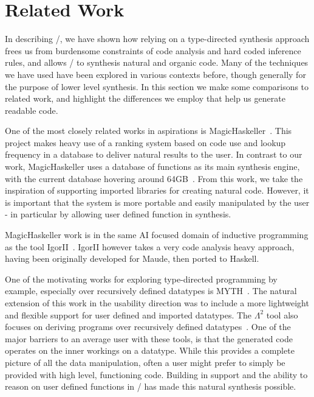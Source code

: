 \section{Related Work}
\label{sec:related}

In describing \ourTool/, we have shown how relying on a type-directed synthesis approach frees us from burdensome constraints of code analysis and hard coded inference rules, and allows \ourTool/ to synthesis natural and organic code. Many of the techniques we have used have been explored in various contexts before, though generally for the purpose of lower level synthesis. In this section we make some comparisons to related work, and highlight the differences we employ that help us generate readable code.

One of the most closely related works in aspirations is MagicHaskeller~\cite{DBLP:conf/aaip/Katayama09}. This project makes heavy use of a ranking system based on code use and lookup frequency in a database to deliver natural results to the user. In contrast to our work, MagicHaskeller uses a database of functions as its main synthesis engine, with the current database hovering around 
64GB~\cite{DBLP:conf/agi/Katayama15}. From this work, we take the inspiration of supporting imported libraries for creating natural code. However, it is important that the system is more portable and easily manipulated by the user - in particular by allowing user defined function in synthesis.

MagicHaskeller work is in the same AI focused domain of inductive programming as the tool IgorII~\cite{DBLP:conf/aaip/HofmannKS09}. IgorII however takes a very code analysis heavy approach, having been originally developed for Maude, then ported to Haskell.

One of the motivating works for exploring type-directed programming by example, especially over recursively defined datatypes is MYTH~\cite{Osera:2015, Osera:2016}. The natural extension of this work in the usability direction was to include a more lightweight and flexible support for user defined and imported datatypes. The $\Lambda^2$ tool also focuses on deriving programs over recursively defined datatypes~\cite{Feser:2015}. One of the major barriers to an average user with these tools, is that the generated code operates on the inner workings on a datatype. While this provides a complete picture of all the data manipulation, often a user might prefer to simply be provided with high level, functioning code. Building in support and the ability to reason on user defined functions in \ourTool/ has made this natural synthesis possible.

